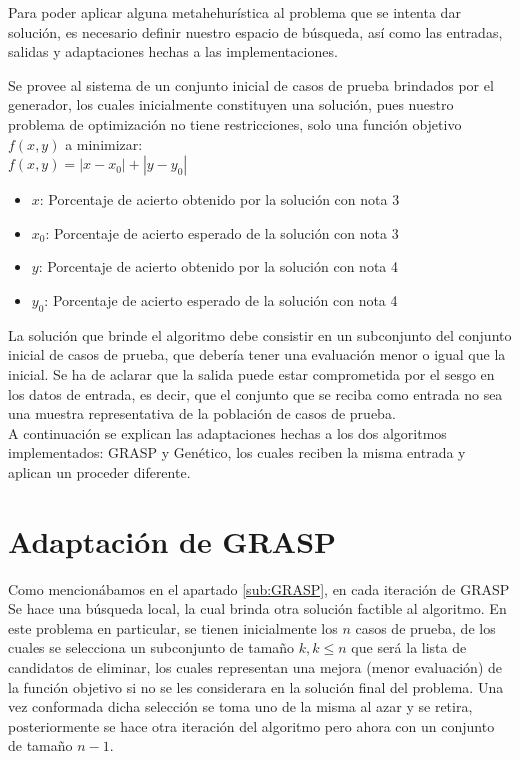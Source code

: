 \documentclass[a4paper,12pt]{book}
\begin{document}
	Para poder aplicar alguna metahehurística al problema que se intenta dar solución, es necesario definir nuestro espacio de búsqueda, así como las entradas, salidas y adaptaciones hechas a las implementaciones.
	
	Se provee al sistema de un conjunto inicial de casos de prueba brindados por el generador, los cuales inicialmente constituyen una solución, pues nuestro problema de optimización no tiene restricciones, solo una función objetivo $f(x,y)$ a minimizar: \\
	
	$f(x,y) = |x - x_0| + |y - y_0|$ \label{fo}
	
	\begin{itemize}
		\item $x$: Porcentaje de acierto obtenido por la solución con nota 3
		\item $x_0$: Porcentaje de acierto esperado de la solución con nota 3
		\item $y$: Porcentaje de acierto obtenido por la solución con nota 4
		\item $y_0$: Porcentaje de acierto esperado de la solución con nota 4
	\end{itemize}

	La solución que brinde el algoritmo debe consistir en un subconjunto del conjunto inicial de casos de prueba, que debería tener una evaluación menor o igual que la inicial. Se ha de aclarar que la salida puede estar comprometida por el sesgo en los datos de entrada, es decir, que el conjunto que se reciba como entrada no sea una muestra representativa de la población de casos de prueba. \\
	
	A continuación se explican las adaptaciones hechas a los dos algoritmos implementados: GRASP y Genético, los cuales reciben la misma entrada y aplican un proceder diferente.
	
	\section{Adaptación de GRASP}
		Como mencionábamos en el apartado \ref{sub:GRASP}, en cada iteración de GRASP Se hace una búsqueda local, la cual brinda otra solución factible al algoritmo. En este problema en particular, se tienen inicialmente los $n$ casos de prueba, de los cuales se selecciona un subconjunto de tamaño $k, k \leq n$ que será la lista de candidatos de eliminar, los cuales representan una mejora (menor evaluación) de la función objetivo si no se les considerara en la solución final del problema. Una vez conformada dicha selección se toma uno de la misma al azar y se retira, posteriormente se hace otra iteración del algoritmo pero ahora con un conjunto de tamaño $n-1$.
		
\end{document}
